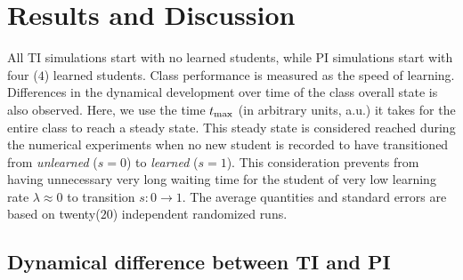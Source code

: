 \documentclass[twocolumn,secnumarabic,amssymb, nobibnotes, aps, prd]{revtex4-2}
\begin{document}


\section{Results and Discussion}
    
    All TI simulations start with no learned students, while PI simulations start with four ($4$) learned students.
    Class performance is measured as the speed of learning.
    Differences in the dynamical development over time of the class overall state is also observed.
    Here, we use the time $t_{\rm max}$ (in arbitrary units, a.u.) it takes for the entire class to reach a steady state.
    This steady state is considered reached during the numerical experiments when no new student is recorded to have transitioned from {\it unlearned} ($s=0$) to {\it learned} ($s=1$).
    This consideration prevents from having unnecessary very long waiting time for the student of very low learning rate $\lambda\approx{0}$ to transition $s:{0}\rightarrow{1}$.
    The average quantities and standard errors are based on twenty($20$) independent randomized runs.

    \subsection{Dynamical difference between TI and PI}
\end{document}
